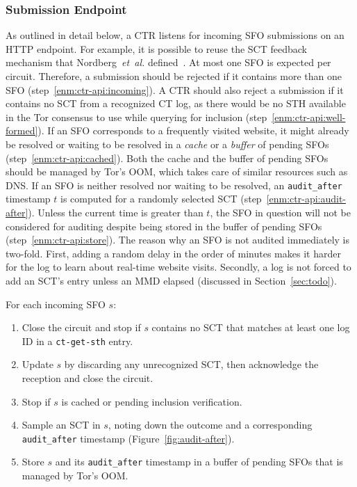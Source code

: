 \subsubsection{Submission Endpoint} \label{sec:design:api}
As outlined in detail below, a CTR listens for incoming SFO submissions on an
HTTP endpoint.  For example, it is possible to reuse the SCT feedback mechanism
that Nordberg~\emph{et~al.} defined~\cite{nordberg}.  At most one SFO is
expected per circuit.  Therefore, a submission should be rejected if it
contains more than one SFO (step~\ref{enm:ctr-api:incoming}).
A CTR should also reject a submission if it contains no SCT from a recognized CT
log, as there would be no STH available in the Tor consensus to use while
querying for inclusion (step~\ref{enm:ctr-api:well-formed}).
If an SFO corresponds to a frequently visited website, it might already be
resolved or waiting to be resolved in a \emph{cache} or a \emph{buffer} of
pending SFOs (step~\ref{enm:ctr-api:cached}).
Both the cache and the buffer of pending SFOs should be managed by Tor's OOM,
which takes care of similar resources such as DNS.  If an SFO is neither
resolved nor waiting to be resolved, an \texttt{audit\_after} timestamp $t$ is
computed for a randomly selected SCT (step~\ref{enm:ctr-api:audit-after}).
Unless the current time is greater than $t$, the SFO in question will not be
considered for auditing despite being stored in the buffer of pending SFOs
(step~\ref{enm:ctr-api:store}).
The reason why an SFO is not audited immediately is two-fold.  First, adding a
random delay in the order of minutes makes it harder for the log to learn about
real-time website visits.  Secondly, a log is not forced to add an SCT's entry
unless an MMD elapsed (discussed in Section~\ref{sec:todo}).

For each incoming SFO $s$:
\begin{enumerate}
	\item\label{enm:ctr-api:well-formed} Close the circuit and stop if $s$
		contains no SCT that matches at least one log ID in a
	\texttt{ct-get-sth} entry.
	\item\label{enm:ctr-api:ack} Update $s$ by discarding any
		unrecognized SCT,
		then acknowledge the reception and close the circuit.
	\item\label{enm:ctr-api:cached}
		Stop if $s$ is cached or pending inclusion verification.
	\item\label{enm:ctr-api:audit-after} Sample an SCT in $s$, noting down the
		outcome and a corresponding \texttt{audit\_after} timestamp
		(Figure~\ref{fig:audit-after}).
	\item\label{enm:ctr-api:store} Store $s$ and its \texttt{audit\_after}
		timestamp in a buffer of pending SFOs that is managed by Tor's OOM.
\end{enumerate}

